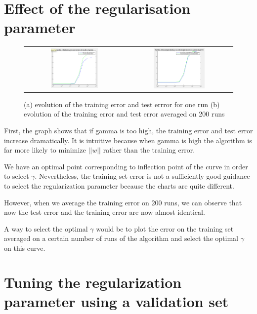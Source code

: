 \documentclass{article} %
\begin{document}
\section{Effect of the regularisation parameter}

  \begin{figure}[H]
\center
\begin{tabular}{cc}
\includegraphics[width=0.5\textwidth]{error4}&\includegraphics[width=0.5\textwidth]{averagederror4}
\end{tabular}
\caption{ (a) evolution of the training error and test errror for one run (b) evolution of the training error and test error averaged on 200 runs}
\end{figure}

First, the graph shows that if gamma is too high, the training error and test error increase dramatically. It is intuitive because when gamma is high the algorithm is far more likely to minimize $||w||$  rather than the training error.


We have an optimal point corresponding to inflection point of the curve in order to select $\gamma$. Nevertheless, the training set error is not a sufficiently good guidance to select the regularization parameter because the charts are quite different. 

However, when we average the training error on 200 runs, we can observe that now the test error and the training error are now almost identical.

A way to select the optimal $\gamma$ would be to plot the error on the training set averaged on a certain number of runs of the algorithm and select the optimal $\gamma$ on this curve. 


\section{Tuning the regularization parameter using a validation set}
\end{document}
